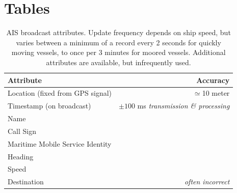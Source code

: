 \chapter{Tables}

\begin{table}[htbp]
  \caption[AIS broadcast attributes]{AIS broadcast attributes. Update frequency depends on ship speed, but varies between a minimum of a record every 2 seconds for quickly moving vessels, to once per 3 minutes for moored vessels. Additional attributes are available, but infrequently used.}
  \begin{tabular}{lr}
    \hline
    Attribute & Accuracy \\
    \hline
    Location (fixed from GPS signal) & $\simeq$10 meter \\
    Timestamp (on broadcast) & $\pm100$ ms \textit{transmission \& processing}\\
    Name \\
    Call Sign \\
    Maritime Mobile Service Identity \\
    Heading \\
    Speed \\
    Destination & \textit{often incorrect}
  \end{tabular}
  \label{table:ais-broadcast-attributes}
\end{table}

